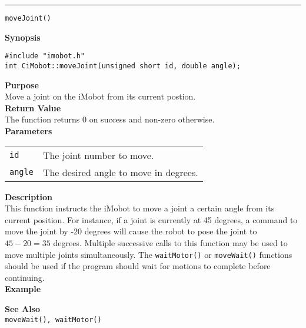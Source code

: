 \noindent
\vspace{5pt}
\rule{6.5in}{0.015in}
\noindent
{\LARGE \texttt{moveJoint()}}\\
{}

\noindent
{\bf Synopsis}\\
\begin{verbatim}
#include "imobot.h"
int CiMobot::moveJoint(unsigned short id, double angle);
\end{verbatim}

\noindent
{\bf Purpose}\\
Move a joint on the iMobot from its current postion.\\

\noindent
{\bf Return Value}\\
The function returns 0 on success and non-zero otherwise.\\

\noindent
{\bf Parameters}
\vspace{-0.1in}
\begin{description}
\item               
\begin{tabular}{p{10 mm}p{145 mm}}
\texttt{id} & The joint number to move. \\
\texttt{angle} & The desired angle to move in degrees.
\end{tabular}
\end{description}

\noindent
{\bf Description}\\
This function instructs the iMobot to move a joint a certain angle from its current position.
For instance, if a joint is currently at 45 degrees, a command to move the joint by -20 degrees will cause the robot to pose the joint to $45-20 = 35$ degrees.
Multiple successive calls to this function may be used to move multiple joints
simultaneously. The \texttt{waitMotor()} or \texttt{moveWait()} functions should
be used if the program should wait for motions to complete before continuing. \\

\noindent
{\bf Example}\\
\noindent

\noindent
{\bf See Also}\\
\texttt{moveWait(), waitMotor()}

